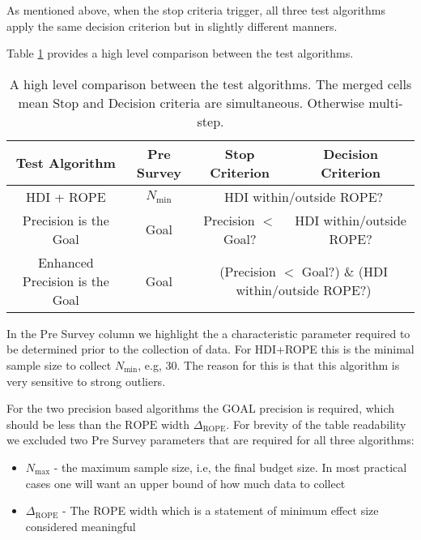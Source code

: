 As mentioned above, when the stop criteria trigger, all three test algorithms
apply the same decision criterion but in slightly different manners.


Table \ref{tab:table1} provides a high level comparison between the test algorithms.


\begin{table}[h!]\label{tab:table1}
    \begin{center}
      \begin{tabular}{c|c|c|c}
        \textbf{Test Algorithm } & \textbf{Pre Survey} & \textbf{Stop Criterion} &  \textbf{Decision Criterion}\\
        \hline
        HDI + ROPE & $N_\mathrm{min}$  & \multicolumn{2}{c}{\multirow{1}{*}{HDI within/outside ROPE?}}  \\
        Precision is the Goal & Goal & Precision $<$ Goal? & HDI within/outside ROPE? \\
        Enhanced Precision is the Goal & Goal& \multicolumn{2}{c}{\multirow{1}{*}{(Precision $<$ Goal?) \& (HDI within/outside ROPE?)}}  \\
      \end{tabular}
      \caption{A high level comparison between the test algorithms.
      The merged cells mean Stop and Decision criteria are simultaneous.
      Otherwise multi-step.
      }
    \end{center}
  \end{table}

In the Pre Survey column we highlight the a characteristic parameter required to be
determined prior to the collection of data. For HDI+ROPE this is the minimal sample size
to collect $N_\mathrm{min}$, e.g, 30. The reason for this is that this algorithm
is very sensitive to strong outliers.

For the two precision based algorithms the $\mathrm{GOAL}$ precision is required,
which should be less than the $\mathrm{ROPE}$ width $\Delta_\mathrm{ROPE}$. For brevity of the table
readability we excluded two Pre Survey parameters that are required for all three
algorithms:
\begin{itemize}
    \item $N_\mathrm{max}$ - the maximum sample size, i.e, the final budget size. In most practical cases one will want an upper bound of how much data to collect
    \item $\Delta_\mathrm{ROPE}$ - The ROPE width which is a statement of minimum effect size considered meaningful
\end{itemize}

